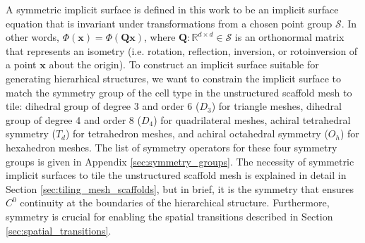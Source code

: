 \documentclass[acmtog]{acmart}
\begin{document}
A symmetric implicit surface is defined in this work to be an implicit surface equation that is invariant under transformations from a chosen point group $\mathcal{S}$. In other words, $\Phi(\mathbf{x}) = \Phi(\mathbf{Q} \mathbf{x})$, where $\mathbf{Q}: \mathbb{R}^{d \times d} \in \mathcal{S}$ is an orthonormal matrix that represents an isometry (i.e. rotation, reflection, inversion, or rotoinversion of a point $\mathbf{x}$ about the origin). To construct an implicit surface suitable for generating hierarhical structures, we want to constrain the implicit surface to match the symmetry group of the cell type in the unstructured scaffold mesh to tile: dihedral group of degree 3 and order 6 ($D_3$) for triangle meshes, dihedral group of degree 4 and order 8 ($D_4$) for quadrilateral meshes, achiral tetrahedral symmetry ($T_d$) for tetrahedron meshes, and achiral octahedral symmetry ($O_h$) for hexahedron meshes. The list of symmetry operators for these four symmetry groups is given in Appendix \ref{sec:symmetry_groups}. The necessity of symmetric implicit surfaces to tile the unstructured scaffold mesh is explained in detail in Section \ref{sec:tiling_mesh_scaffolds}, but in brief, it is the symmetry that ensures $C^0$ continuity at the boundaries of the hierarchical structure. Furthermore, symmetry is crucial for enabling the spatial transitions described in Section \ref{sec:spatial_transitions}.
\end{document}
